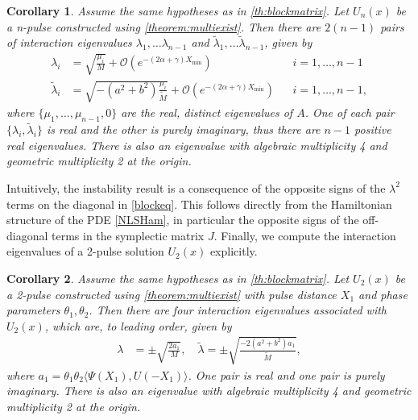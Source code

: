 \documentclass[12pt]{elsarticle}
\newtheorem{corollary}{Corollary}
\begin{document}
\begin{corollary}\label{corr:multiunstable}
Assume the same hypotheses as in \cref{th:blockmatrix}. Let $U_n(x)$ be a n-pulse constructed using \cref{theorem:multiexist}. Then there are $2(n-1)$ pairs of interaction eigenvalues $\lambda_1, \dots \lambda_{n-1}$ and $\tilde{\lambda}_1, \dots \tilde{\lambda}_{n-1}$, given by
\begin{equation}\label{inteigs}
\begin{aligned}
\lambda_i &= \sqrt{\frac{\mu_i}{M}} + \mathcal{O}\left( e^{-(2 \alpha + \gamma)X_{\min} } \right) && i = 1, \dots, n-1 \\
\tilde{\lambda}_i &= \sqrt{-(a^2 + b^2) \frac{\mu_i}{\tilde{M}}} + \mathcal{O}\left( e^{-(2 \alpha + \gamma)X_{\min} } \right) && i = 1, \dots, n-1,
\end{aligned}
\end{equation}
where $\{ \mu_1,\dots,\mu_{n-1}, 0\}$ are the real, distinct eigenvalues of $A$. One of each pair $\{\lambda_i, \tilde{\lambda}_i\}$ is real and the other is purely imaginary, thus there are $n-1$ positive real eigenvalues. There is also an eigenvalue with algebraic multiplicity 4 and geometric multiplicity 2 at the origin.
\end{corollary}

Intuitively, the instability result is a consequence of the opposite signs of the $\lambda^2$ terms on the diagonal in \cref{blockeq}. This follows directly from the Hamiltonian structure of the PDE \cref{NLSHam}, in particular the opposite signs of the off-diagonal terms in the symplectic matrix $J$. Finally, we compute the interaction eigenvalues of a 2-pulse solution $U_2(x)$ explicitly.

\begin{corollary}\label{corr:2pstab}
Assume the same hypotheses as in \cref{th:blockmatrix}. Let $U_2(x)$ be a 2-pulse constructed using \cref{theorem:multiexist} with pulse distance $X_1$ and phase parameters $\theta_1, \theta_2$. Then there are four interaction eigenvalues associated with $U_2(x)$, which are, to leading order, given by
\begin{equation}\label{inteigpred}
\begin{aligned}
\lambda &= \pm \sqrt{ \frac{2 a_1}{M} }, \quad
\tilde{\lambda} = \pm \sqrt{ \frac{-2 (a^2 + b^2) a_1}{\tilde{M}} },
\end{aligned}
\end{equation}
where $a_1 = \theta_1 \theta_2 \langle \Psi(X_1), U(-X_1) \rangle$. One pair is real and one pair is purely imaginary. There is also an eigenvalue with algebraic multiplicity 4 and geometric multiplicity 2 at the origin.
\end{corollary}
\end{document}
